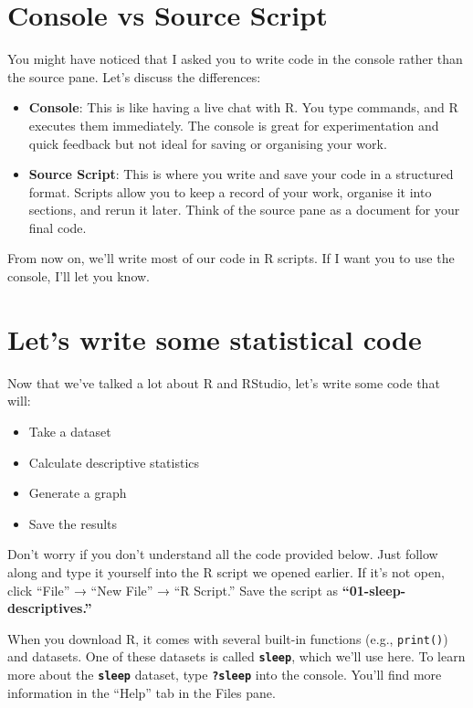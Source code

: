 \documentclass[
]{book}
\begin{document}
\section{Console vs Source Script}\label{console-vs-source-script}

You might have noticed that I asked you to write code in the console rather than the source pane. Let's discuss the differences:

\begin{itemize}
\item
  \textbf{Console}: This is like having a live chat with R. You type commands, and R executes them immediately. The console is great for experimentation and quick feedback but not ideal for saving or organising your work.
\item
  \textbf{Source Script}: This is where you write and save your code in a structured format. Scripts allow you to keep a record of your work, organise it into sections, and rerun it later. Think of the source pane as a document for your final code.
\end{itemize}

From now on, we'll write most of our code in R scripts. If I want you to use the console, I'll let you know.

\section{Let's write some statistical code}\label{firstpieceofcode}

Now that we've talked a lot about R and RStudio, let's write some code that will:

\begin{itemize}
\item
  Take a dataset
\item
  Calculate descriptive statistics
\item
  Generate a graph
\item
  Save the results
\end{itemize}

Don't worry if you don't understand all the code provided below. Just follow along and type it yourself into the R script we opened earlier. If it's not open, click ``File'' → ``New File'' → ``R Script.'' Save the script as \textbf{``01-sleep-descriptives.''}

When you download R, it comes with several built-in functions (e.g., \texttt{print()}) and datasets. One of these datasets is called \textbf{\texttt{sleep}}, which we'll use here. To learn more about the \textbf{\texttt{sleep}} dataset, type \textbf{\texttt{?sleep}} into the console. You'll find more information in the ``Help'' tab in the Files pane.
\end{document}
